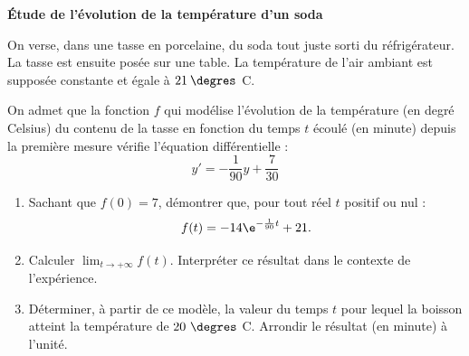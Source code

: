 \begin{center}
\textbf{Étude de l'évolution de la température d'un soda}
\end{center}

On verse, dans une tasse en porcelaine, du soda tout juste sorti du réfrigérateur. La tasse est ensuite posée sur une table. La température de l'air ambiant est supposée constante et égale à $21\:\degres$ C.

On admet que la fonction $f$ qui modélise l'évolution de la température (en degré Celsius) du contenu de la tasse en fonction du temps $t$ écoulé (en minute) depuis la première mesure vérifie l'équation différentielle :
\[y' = - \dfrac{1}{90}y + \dfrac{7}{30}\]

\begin{enumerate}[start=2]
\item Sachant que $f(0) = 7$, démontrer que, pour tout réel $t$ positif ou nul :
\[f(t) = - 14 \e^{- \frac{1}{90}t} + 21.\]

\item Calculer $\displaystyle\lim_{t \to + \infty} f(t)$.
Interpréter ce résultat dans le contexte de l'expérience.

\item Déterminer, à partir de ce modèle, la valeur du temps $t$ pour lequel la boisson atteint la température de $20~\degres$ C. Arrondir le résultat (en minute) à l'unité.
\end{enumerate}

\bigskip
